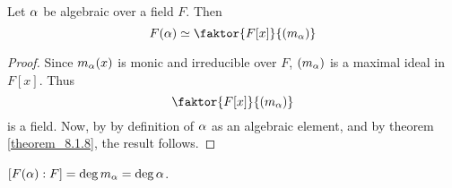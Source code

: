 \begin{proposition}\label{proposition_8.2.3}
  Let $\alpha$ be algebraic over a field  $F$. Then
  \begin{equation*}
    F(\a) \simeq \faktor{F[x]}{(m_\a)}
  \end{equation*}
\end{proposition}
\begin{proof}
  Since $m_\alpha(x)$ is monic and irreducible over $F$, $(m_\alpha)$ is a
  maximal ideal in $F[x]$. Thus
  \begin{equation*}
    \faktor{F[x]}{(m_\a)}
  \end{equation*}
  is a field. Now, by by definition of $\alpha$ as an algebraic element,
  and by theorem \ref{theorem_8.1.8}, the result follows.
\end{proof}
\begin{corollary}
  $[F(\alpha):F]=\deg{m_\alpha}=\deg{\alpha}$.
\end{corollary}

